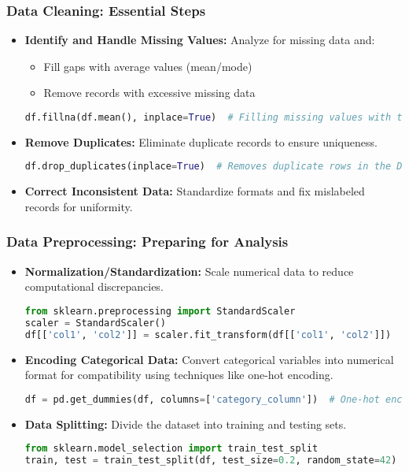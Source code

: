\documentclass[aspectratio=169]{beamer}
\begin{document}
\begin{frame}[fragile]
    \frametitle{Data Cleaning: Essential Steps}
    \begin{itemize}
        \item \textbf{Identify and Handle Missing Values:} Analyze for missing data and:
        \begin{itemize}
            \item Fill gaps with average values (mean/mode)
            \item Remove records with excessive missing data
        \end{itemize}
        \begin{lstlisting}[language=Python]
df.fillna(df.mean(), inplace=True)  # Filling missing values with the mean
        \end{lstlisting}

        \item \textbf{Remove Duplicates:} Eliminate duplicate records to ensure uniqueness.
        \begin{lstlisting}[language=Python]
df.drop_duplicates(inplace=True)  # Removes duplicate rows in the DataFrame
        \end{lstlisting}

        \item \textbf{Correct Inconsistent Data:} Standardize formats and fix mislabeled records for uniformity.
    \end{itemize}
\end{frame}

\begin{frame}[fragile]
    \frametitle{Data Preprocessing: Preparing for Analysis}
    \begin{itemize}
        \item \textbf{Normalization/Standardization:} Scale numerical data to reduce computational discrepancies.
        \begin{lstlisting}[language=Python]
from sklearn.preprocessing import StandardScaler
scaler = StandardScaler()
df[['col1', 'col2']] = scaler.fit_transform(df[['col1', 'col2']])
        \end{lstlisting}

        \item \textbf{Encoding Categorical Data:} Convert categorical variables into numerical format for compatibility using techniques like one-hot encoding.
        \begin{lstlisting}[language=Python]
df = pd.get_dummies(df, columns=['category_column'])  # One-hot encoding
        \end{lstlisting}

        \item \textbf{Data Splitting:} Divide the dataset into training and testing sets.
        \begin{lstlisting}[language=Python]
from sklearn.model_selection import train_test_split
train, test = train_test_split(df, test_size=0.2, random_state=42)
        \end{lstlisting}
    \end{itemize}
\end{frame}
\end{document}
